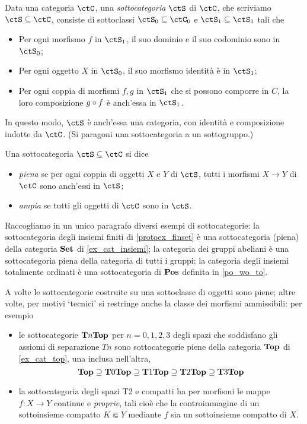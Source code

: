 \begin{definition}\label{def_subcat}
	Data una categoria \(\ctC\), una \emph{sottocategoria} \(\ctS\) di \(\ctC\), che scriviamo \(\ctS\subseteq \ctC\), consiste di sottoclassi \(\ctS_0\subseteq\ctC_0\) e \(\ctS_1\subseteq\ctS_1\) tali che
	\begin{itemize}
		\item Per ogni morfismo \(f\) in \(\ctS_1\), il suo dominio e il suo codominio sono in \(\ctS_0\);
		\item Per ogni oggetto \(X\) in \(\ctS_0\), il suo morfismo identità è in \(\ctS_1\);
		\item Per ogni coppia di morfismi \(f,g\) in \(\ctS_1\) che si possono comporre in \(C\), la loro composizione \(g\circ f\) è anch'essa in \(\ctS_1\).
	\end{itemize}
	In questo modo, \(\ctS\) è anch'essa una categoria, con identità e composizione indotte da \(\ctC\). (Si paragoni una sottocategoria a un sottogruppo.)

	Una sottocategoria \(\ctS\subseteq \ctC\) si dice
	\begin{itemize}
		\item \emph{piena} se per ogni coppia di oggetti \(X\) e \(Y\) di \(\ctS\), tutti i morfismi \(X\to Y\) di \(\ctC\) sono anch'essi in \(\ctS\);
		\item \emph{ampia} se tutti gli oggetti di \(\ctC\) sono in \(\ctS\).
	\end{itemize}
\end{definition}
\begin{example}
	Raccogliamo in un unico paragrafo diversi esempi di sottocategorie: la sottocategoria degli insiemi finiti di \ref{protoex_finset} è una sottocategoria (piena) della categoria \(\mathbf{Set}\) di \ref{ex_cat_insiemi}; la categoria dei gruppi abeliani è una sottocategoria piena della categoria di tutti i gruppi; la categoria degli insiemi totalmente ordinati è una sottocategoria di \(\mathbf{Pos}\) definita in \ref{po_wo_to}.

	A volte le sottocategorie costruite su una sottoclasse di oggetti sono piene; altre volte, per motivi `tecnici' si restringe anche la classe dei morfismi ammissibili: per esempio
	\begin{itemize}
		\item le sottocategorie \(\mathbf{T}n\mathbf{Top}\) per \(n=0,1,2,3\) degli spazi che soddisfano gli assiomi di separazione \(Tn\) sono sottocategorie piene della categoria \(\mathbf{Top}\) di \ref{ex_cat_top}, una inclusa nell'altra,
		      \[\mathbf{Top}\supseteq\mathbf{T}0\mathbf{Top}\supseteq\mathbf{T}1\mathbf{Top}\supseteq\mathbf{T}2\mathbf{Top}\supseteq\mathbf{T}3\mathbf{Top}\]
		\item la sottocategoria degli spazi T2 e compatti ha per morfismi le mappe \(f : X\to Y\) continue e \emph{proprie}, tali cioè che la controimmagine di un sottoinsieme compatto \(K\Subset Y\) mediante \(f\) sia un sottoinsieme compatto di \(X\).
	\end{itemize}
\end{example}
